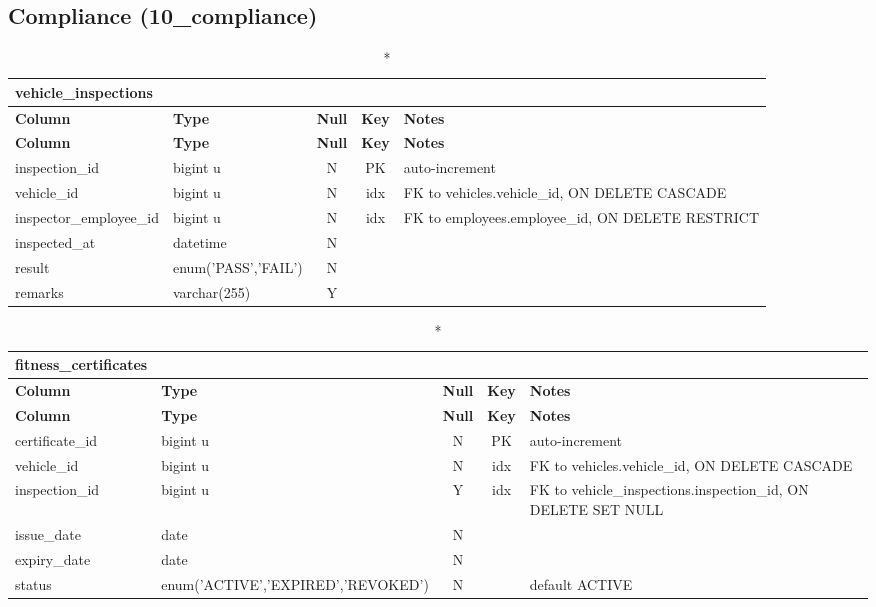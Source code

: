\subsection*{Compliance (10\_compliance)}
\begin{longtable}{@{}p{3.4cm}p{2.9cm}c c p{5.6cm}@{}}
\caption*{\textbf{vehicle\_\allowbreak{}inspections}}\\
\toprule \textbf{Column} & \textbf{Type} & \textbf{Null} & \textbf{Key} & \textbf{Notes} \\ \midrule \endfirsthead
\toprule \textbf{Column} & \textbf{Type} & \textbf{Null} & \textbf{Key} & \textbf{Notes} \\ \midrule \endhead
\bottomrule \endlastfoot
inspection\_\allowbreak{}id & bigint u & N & PK & auto-increment \\
vehicle\_\allowbreak{}id & bigint u & N & idx & FK to vehicles.vehicle\_\allowbreak{}id, ON DELETE CASCADE \\
inspector\_\allowbreak{}employee\_\allowbreak{}id & bigint u & N & idx & FK to employees.employee\_\allowbreak{}id, ON DELETE RESTRICT \\
inspected\_\allowbreak{}at & datetime & N &  &  \\
result & enum('PASS',\allowbreak{}'FAIL') & N &  &  \\
remarks & varchar(255) & Y &  &  \\
\end{longtable}
\vspace{-0.4em}
\begin{longtable}{@{}p{3.4cm}p{2.9cm}c c p{5.6cm}@{}}
\caption*{\textbf{fitness\_\allowbreak{}certificates}}\\
\toprule \textbf{Column} & \textbf{Type} & \textbf{Null} & \textbf{Key} & \textbf{Notes} \\ \midrule \endfirsthead
\toprule \textbf{Column} & \textbf{Type} & \textbf{Null} & \textbf{Key} & \textbf{Notes} \\ \midrule \endhead
\bottomrule \endlastfoot
certificate\_\allowbreak{}id & bigint u & N & PK & auto-increment \\
vehicle\_\allowbreak{}id & bigint u & N & idx & FK to vehicles.vehicle\_\allowbreak{}id, ON DELETE CASCADE \\
inspection\_\allowbreak{}id & bigint u & Y & idx & FK to vehicle\_\allowbreak{}inspections.inspection\_\allowbreak{}id, ON DELETE SET NULL \\
issue\_\allowbreak{}date & date & N &  &  \\
expiry\_\allowbreak{}date & date & N &  &  \\
status & enum('ACTIVE',\allowbreak{}'EXPIRED',\allowbreak{}'REVOKED') & N &  & default ACTIVE \\
\end{longtable}
